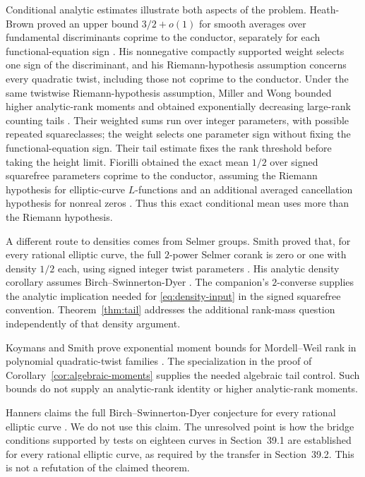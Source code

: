 Conditional analytic estimates illustrate both aspects of the problem.
Heath-Brown proved an upper bound \(3/2+o(1)\) for smooth averages over
fundamental discriminants coprime to the conductor, separately for each
functional-equation sign \cite[Theorem~3]{HeathBrown2003}.
His nonnegative compactly supported weight selects one sign of the
discriminant, and his Riemann-hypothesis assumption concerns every
quadratic twist, including those not coprime to the conductor.
Under the same twistwise Riemann-hypothesis assumption, Miller and Wong
bounded higher analytic-rank moments and obtained exponentially
decreasing large-rank counting tails
\cite[Theorem~1.1 and Corollary~1.2]{MillerWong2012}.
Their weighted sums run over integer parameters, with possible repeated
squareclasses; the weight selects one parameter sign without fixing the
functional-equation sign. Their tail estimate fixes the rank threshold
before taking the height limit. Fiorilli obtained the exact mean \(1/2\) over
signed squarefree parameters coprime to the conductor, assuming the
Riemann hypothesis for elliptic-curve \(L\)-functions and an additional
averaged cancellation hypothesis for nonreal zeros
\cite[Theorem~1.1 and Hypothesis~M]{Fiorilli2016}.
Thus this exact conditional mean uses more than the Riemann hypothesis.

A different route to densities comes from Selmer groups.
Smith proved that, for every rational elliptic curve, the full
\(2\)-power Selmer corank is zero or one with density \(1/2\) each,
using signed integer twist parameters
\cite[Theorem~1.1]{Smith2025}. His analytic density corollary assumes
Birch--Swinnerton-Dyer \cite[Corollary~1.2]{Smith2025}.
The companion's \(2\)-converse supplies the analytic implication needed
for \eqref{eq:density-input} in the signed squarefree convention.
Theorem~\ref{thm:tail} addresses the additional rank-mass question
independently of that density argument.

Koymans and Smith prove exponential moment bounds for Mordell--Weil rank
in polynomial quadratic-twist families
\cite[Theorem~1.4]{KoymansSmith2026}. The specialization in the proof of
Corollary~\ref{cor:algebraic-moments} supplies the needed algebraic
tail control. Such bounds do not supply an analytic-rank identity or
higher analytic-rank moments.

Hanners claims the full Birch--Swinnerton-Dyer conjecture for every
rational elliptic curve \cite[Theorems~28.1, 39.4 and~39.5]{Hanners2026}. We do not use
this claim. The unresolved point is how the bridge conditions supported
by tests on eighteen curves in Section~39.1 are established for every
rational elliptic curve, as required by the transfer in Section~39.2.
This is not a refutation of the claimed theorem.

